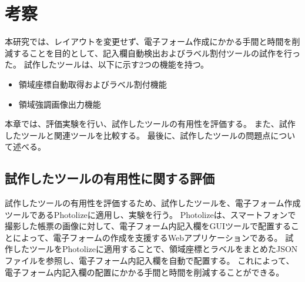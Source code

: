 \chapter{考察}\label{cha:Discussion}
本研究では、レイアウトを変更せず、電子フォーム作成にかかる手間と時間を削減することを目的として、記入欄自動検出およびラベル割付ツールの試作を行った。
試作したツールは、以下に示す2つの機能を持つ。

\begin{itemize}
  \item 領域座標自動取得およびラベル割付機能
  \item 領域強調画像出力機能
\end{itemize}

本章では、評価実験を行い、試作したツールの有用性を評価する。
また、試作したツールと関連ツールを比較する。
最後に、試作したツールの問題点について述べる。

\section{試作したツールの有用性に関する評価}\label{sec:evalue_usefulness}
試作したツールの有用性を評価するため、試作したツールを、電子フォーム作成ツールであるPhotolize\cite{Photolize}に適用し、実験を行う。
Photolizeは、スマートフォンで撮影した帳票の画像に対して、電子フォーム内記入欄をGUIツールで配置することによって、電子フォームの作成を支援するWebアプリケーションである。
試作したツールをPhotolizeに適用することで、領域座標とラベルをまとめたJSONファイルを参照し、電子フォーム内記入欄を自動で配置する。
これによって、電子フォーム内記入欄の配置にかかる手間と時間を削減することができる。

